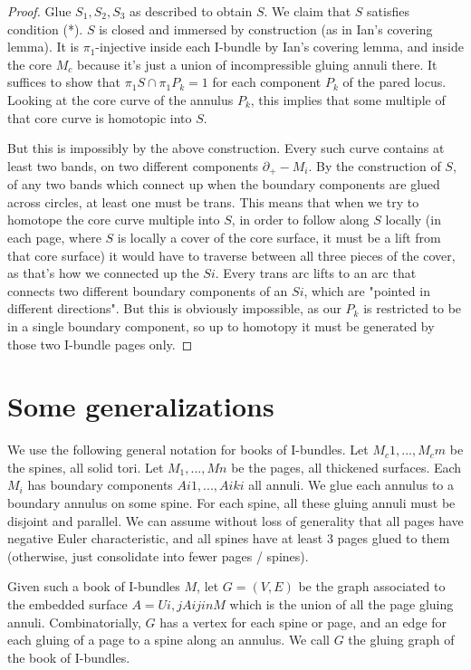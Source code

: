\documentclass[12pt]{amsart}
\theoremstyle{definition}
\newcommand{\bd}{\partial}
\begin{document}
\begin{proof}
Glue $S_1,S_2,S_3$ as described to obtain $S$. We claim that $S$ satisfies condition
(*). $S$ is closed and immersed by construction (as in Ian's covering lemma). It
is $\pi_1$-injective inside each I-bundle by Ian's covering lemma, and inside the
core $M_c$ because it's just a union of incompressible gluing annuli there. It
suffices to show that $\pi_1S \cap \pi_1P_k = 1$ for each component $P_k$ of the
pared locus. Looking at the core curve of the annulus $P_k$, this implies that
some multiple of that core curve is homotopic into $S$.

But this is impossibly by the above construction. Every such curve contains at
least two bands, on two different components $\bd_+-M_i$. By the construction of
$S$,
of any two bands which connect up when the boundary components are glued across
circles, at least one must be trans. This means that when we try to homotope
the core curve multiple into $S$, in order to follow along $S$ locally (in each
page, where $S$ is locally a cover of the core surface, it must be a lift from
that core surface) it would have to traverse between all three pieces of the
cover, as that's how we connected up the $Si$. Every trans arc lifts to an arc
that connects two different boundary components of an $Si$, which are "pointed in
different directions". But this is obviously impossible, as our $P_k$ is
restricted to be in a single boundary component, so up to homotopy it must be
generated by those two I-bundle pages only.

\end{proof}

\section{Some generalizations}

We use the following general notation for books of I-bundles. Let $M_c1,...,M_cm$
be the spines, all solid tori. Let $M_1,...,Mn$ be the pages, all thickened
surfaces. Each $M_i$ has boundary components $Ai1,...,Aiki$ all annuli. We glue each
annulus to a boundary annulus on some spine. For each spine, all these gluing
annuli must be disjoint and parallel. We can assume without loss of generality
that all pages have negative Euler characteristic, and all spines have at least
3 pages glued to them (otherwise, just consolidate into fewer pages / spines).

Given such a book of I-bundles $M$, let $G=(V,E)$ be the graph associated to the
embedded surface $A = Ui,j Aij in M$ which is the union of all the page gluing
annuli. Combinatorially, $G$ has a vertex for each spine or page, and an edge for
each gluing of a page to a spine along an annulus. We call $G$ the gluing graph
of the book of I-bundles.
\end{document}
